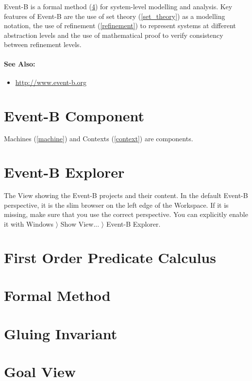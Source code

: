 Event-B is a formal method (\ref{formal_method}) for system-level modelling and analysis. Key features of Event-B are the use of set theory (\ref{set_theory}) as a modelling notation, the use of refinement (\ref{refinement}) to represent systems at different abstraction levels and the use of mathematical proof to verify consistency between refinement levels.

\paragraph{See Also:}
\begin{itemize}
\item \url{http://www.event-b.org}
\end{itemize}

\section{Event-B Component}
\label{eventb_component}

Machines (\ref{machine}) and Contexts (\ref{context}) are components.

\section{Event-B Explorer}
\label{eventb_explorer}

The View showing the Event-B projects and their content.  In the default Event-B perspective, it is the slim browser on the left edge of the Workspace.  If it is missing, make sure that you use the correct perspective.  You can explicitly enable it with \textsf{Windows $\rangle$ Show View... $\rangle$ Event-B Explorer}.

\section{First Order Predicate Calculus}
\label{first_order_predicate_calculus}


\section{Formal Method}
\label{formal_method}

\section{Gluing Invariant}
\label{gluing_invariant}

\section{Goal View}
\label{goal_view}

